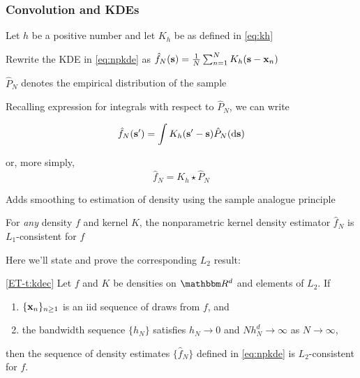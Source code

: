 \begin{frame}\frametitle{Convolution and KDEs}

    \vspace{2em}
    Let $h$ be a positive number and let $K_h$ be as defined in \eqref{eq:kh}
    
    Rewrite the KDE in \eqref{eq:npkde}
        as $\hat f_N({\mathbf s}) 
        = \frac{1}{N} \sum_{n=1}^N K_h({\mathbf s} - {\mathbf x}_n)$
        
    $\hat P_N$ denotes the empirical distribution of the sample
    
    \vspace{.7em}
    Recalling expression for integrals with respect to $\hat P_N$, we can write 
    
    $$\hat f_N({\mathbf s}') =  \int K_h({\mathbf s}' - {\mathbf s}) \hat P_N(\mathop{}\!\mathrm{d} {\mathbf s})$$
    
    or, more simply, 
    \begin{equation}
        \label{eq:kdeac}
        \hat f_N = K_h \star \hat P_N
    \end{equation}
    
    Adds smoothing to estimation of density using the sample analogue principle

\end{frame}

\begin{frame}

    \vspace{2em}
    For \emph{any} density $f$ and kernel $K$, the
    nonparametric kernel density estimator $\hat f_N$  is $L_1$-consistent for
    $f$
    
    Here we'll state and
    prove the corresponding $L_2$ result: 
    
    \vspace{.7em}
    \Thm
    \eqref{ET-t:kdec}
    Let $f$ and $K$ be densities on $\RR^d$ and elements of $L_2$.
    If
    \begin{enumerate}
        \item $\{{\mathbf x}_n\}_{n \geq 1}$ is an {\sc iid} sequence of draws from
            $f$, and
        \item the bandwidth sequence $\{h_N\}$ satisfies $h_N \to 0$ and $N h_N^d \to \infty$ as $N \to \infty$,
    \end{enumerate}
    then the sequence of density estimates $\{\hat f_N\}$ defined in \eqref{eq:npkde}
    is $L_2$-consistent for $f$.
    
\end{frame}

